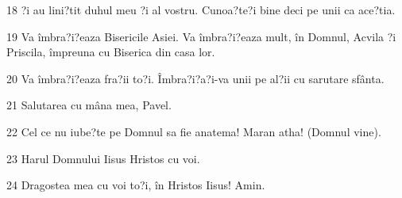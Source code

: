 \par 18 ?i au lini?tit duhul meu ?i al vostru. Cunoa?te?i bine deci pe unii ca ace?tia.
\par 19 Va îmbra?i?eaza Bisericile Asiei. Va îmbra?i?eaza mult, în Domnul, Acvila ?i Priscila, împreuna cu Biserica din casa lor.
\par 20 Va îmbra?i?eaza fra?ii to?i. Îmbra?i?a?i-va unii pe al?ii cu sarutare sfânta.
\par 21 Salutarea cu mâna mea, Pavel.
\par 22 Cel ce nu iube?te pe Domnul sa fie anatema! Maran atha! (Domnul vine).
\par 23 Harul Domnului Iisus Hristos cu voi.
\par 24 Dragostea mea cu voi to?i, în Hristos Iisus! Amin.


